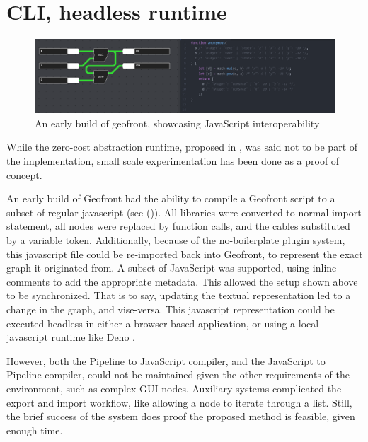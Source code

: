 
\section{CLI, headless runtime}

\begin{figure}
  \centering
  \graphicspath{ {../../assets/images/implementation/} }
  \includegraphics[width=\linewidth]{early-geofront.png}
  \caption[Geofront to js]{An early build of geofront, showcasing JavaScript interoperability }
  \label{fig:early-geofront-compile-to-js}
\end{figure}

While the zero-cost abstraction runtime, proposed in , was said not to be part of the implementation, small scale experimentation has been done as a proof of concept. 

An early build of Geofront had the ability to compile a Geofront script to a subset of regular javascript (see ()).  
All libraries were converted to normal import statement, all nodes were replaced by function calls, and the cables substituted by a variable token. 
Additionally, because of the no-boilerplate plugin system, this javascript file could be re-imported back into Geofront, to represent the exact graph it originated from. 
A subset of JavaScript was supported, using inline comments to add the appropriate metadata.
This allowed the setup shown above to be synchronized.
That is to say, updating the textual representation led to a change in the graph, and vise-versa.
This javascript representation could be executed headless in either a browser-based application, or using a local javascript runtime like Deno \citep{contributors_deno_2022}.

However, both the Pipeline to JavaScript compiler, and the JavaScript to Pipeline compiler, could not be maintained given the other requirements of the environment, such as complex \ac{GUI} nodes.
Auxiliary systems complicated the export and import workflow, like allowing a node to iterate through a list. 
Still, the brief success of the system does proof the proposed method is feasible, given enough time.